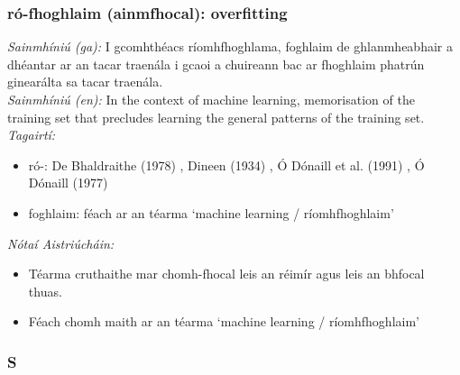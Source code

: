 \subsubsection*{ró-fhoghlaim (ainmfhocal): overfitting}
 \noindent \textit{Sainmhíniú (ga):} I gcomhthéacs ríomhfhoghlama, foghlaim de ghlanmheabhair a dhéantar ar an tacar traenála i gcaoi a chuireann bac ar fhoghlaim phatrún ginearálta sa tacar traenála.
\\
 \noindent \textit{Sainmhíniú (en):} In the context of machine learning, memorisation of the training set that precludes learning the general patterns of the training set.
\\
 \noindent \textit{Tagairtí:}
\begin{itemize}
	\item ró-: De Bhaldraithe (1978) \cite{de-bhaldraithe}, Dineen (1934) \cite{dineen}, Ó Dónaill et al. (1991) \cite{focloir-beag}, Ó Dónaill (1977) \cite{odonaill}
	\item foghlaim: féach ar an téarma `machine learning / ríomhfhoghlaim'
\end{itemize}

 \noindent \textit{Nótaí Aistriúcháin:}
\begin{itemize}
	\item Téarma cruthaithe mar chomh-fhocal leis an réimír agus leis an bhfocal thuas.
	\item Féach chomh maith ar an téarma `machine learning / ríomhfhoghlaim'
\end{itemize}


 \subsubsection*{S}

